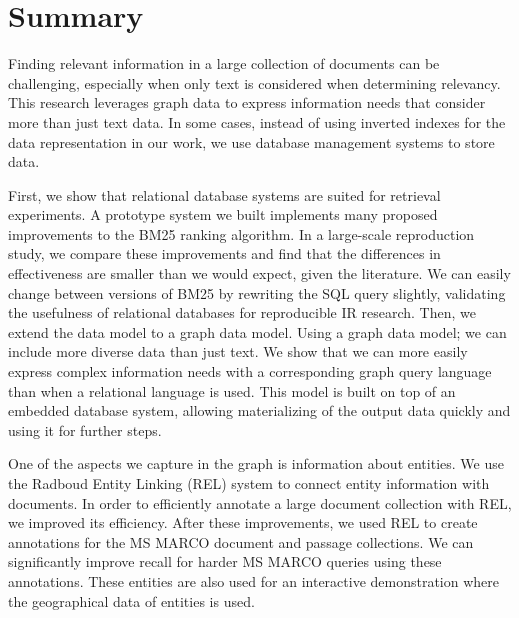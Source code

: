\chapter*{Summary}

Finding relevant information in a large collection of documents can be challenging, especially when only text is considered when determining relevancy. This research leverages graph data to express information needs that consider more than just text data. In some cases, instead of using inverted indexes for the data representation in our work, we use database management systems to store data.

First, we show that relational database systems are suited for retrieval experiments. A prototype system we built implements many proposed improvements to the BM25 ranking algorithm. In a large-scale reproduction study, we compare these improvements and find that the differences in effectiveness are smaller than we would expect, given the literature. We can easily change between versions of BM25 by rewriting the SQL query slightly, validating the usefulness of relational databases for reproducible IR research. 
Then, we extend the data model to a graph data model. Using a graph data model; we can include more diverse data than just text. We show that we can more easily express complex information needs with a corresponding graph query language than when a relational language is used. This model is built on top of an embedded database system, allowing materializing of the output data quickly and using it for further steps.

One of the aspects we capture in the graph is information about entities. We use the Radboud Entity Linking (REL) system to connect entity information with documents. In order to efficiently annotate a large document collection with REL, we improved its efficiency. After these improvements, we used REL to create annotations for the MS MARCO document and passage collections. We can significantly improve recall for harder MS MARCO queries using these annotations. These entities are also used for an interactive demonstration where the geographical data of entities is used.


